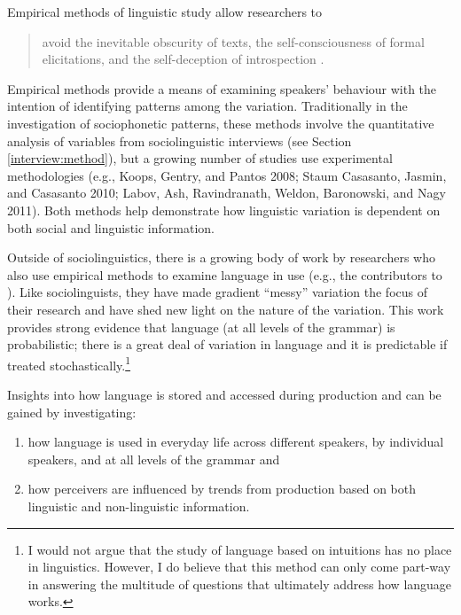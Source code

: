 Empirical methods of linguistic study allow researchers to

\begin{quote}
avoid the inevitable obscurity of texts, the self-con\-scious\-ness of formal elicitations, and the self-deception of introspection \cite[xix]{labov1972sociolingpatterns}.
\end{quote}

\noindent Empirical methods provide a means of examining speakers' behaviour with the intention of identifying patterns among the variation.  Traditionally in the investigation of sociophonetic patterns, these methods involve the quantitative analysis of variables from sociolinguistic interviews (see Section \ref{interview:method}), but a growing number of studies use experimental methodologies (e.g., Koops, Gentry, and Pantos 2008; Staum Casasanto, Jasmin, and Casasanto 2010; Labov, Ash, Ravindranath, Weldon, Baronowski, and Nagy 2011).  Both methods help demonstrate how linguistic variation is dependent on both social and linguistic information. \nocite{koopsetal2008} \nocite{staumcasasantoetal2010} \nocite{labovetal2011}


Outside of sociolinguistics, there is a growing body of work by researchers who also use empirical methods to examine  language in use (e.g., the contributors to ). Like sociolinguists, they have made gradient ``messy'' variation the focus of their research and have shed new light on the nature of the variation.  This work provides strong evidence that language (at all levels of the grammar) is probabilistic; there is a great deal of variation in language and it is predictable if treated stochastically.\footnote{I would not argue that the study of language based on intuitions has no place in linguistics.  However, I do believe that this method can only come part-way in answering the multitude of questions that ultimately address how language works.}

Insights into how language is stored and accessed during production and  can be gained by investigating: \nocite{saussure1916}   

\begin{enumerate}
	\item how language is used in everyday life across different speakers, by individual speakers, and at all levels of the grammar and
	\item how perceivers are influenced by trends from production based on both linguistic and non-linguistic information.
\end{enumerate}

